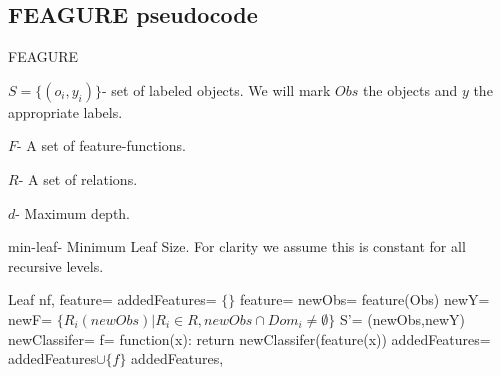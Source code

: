 \documentclass[twoside,11pt]{article}
\theoremstyle{definition}
\begin{document}
\begin{appendices}
	\section{FEAGURE pseudocode} \label{app:2}
	
	\begin{algorithm}[H]
		\caption{FEAGURE}
		\label{code2}
		\small
		$S=\{(o_{i},y_{i})\}$- set of labeled objects. We will mark $Obs$ the objects and $y$ the appropriate labels.
		
		$F$- A set of feature-functions.
		
		$R$- A set of relations.
		
		$d$- Maximum depth.
		
		min-leaf- Minimum Leaf Size. For clarity we assume this is constant for all recursive levels.
		
		\begin{algorithmic}
					\State
					\Return Leaf 
				\EndIf
				\State nf, feature= 
				\State {}
				\State
				\Return {}
			\EndFunction
				\State
				\Return {} 
			\EndIf
			\State addedFeatures= $\{\}$
				\State feature=  
				\State newObs= feature(Obs)
				\State newY=  
				\State newF= $\{R_{i}(newObs)|R_{i}\in R, newObs\cap Dom_{i}\neq\emptyset\}$ 
				\State S'= (newObs,newY)
				\State newClassifer= 
				\State f= function(x): return newClassifer(feature(x))
					\State addedFeatures= addedFeatures$\cup \{f\}$ 
				\EndIf
			\EndWhile
			\State
			\Return addedFeatures, 
			\EndFunction
			
		\end{algorithmic}
	\end{algorithm}
	
\end{appendices}

\vskip 0.2in


%
%
\end{document}
